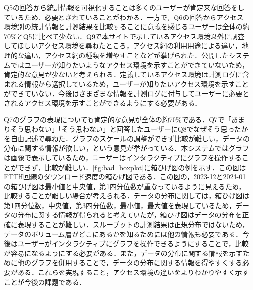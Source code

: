 Q5の回答から統計情報を可視化することは多くのユーザーが肯定来な回答をしているため，必要とされていることがわかる．一方で，Q6の回答からアクセス環境別の統計情報と計測結果を比較することに意義を感じるユーザーは全体の約70\%とQ5に比べて少ない．Q9で本サイトで示しているアクセス環境以外に調査してほしいアクセス環境を尋ねたところ，アクセス網の利用用途による違い，地理的な違い，アクセス網の種類を増やすことなどが挙げられた．公開したシステムではユーザーが知りたいようなアクセス環境を示すことができていないため，肯定的な意見が少ないと考えられる．定義しているアクセス環境は計測ログに含まれる情報から選択しているため，ユーザーが知りたいアクセス環境を示すことができていない．今後はさまざまな情報を計測ログに付与してユーザーに必要とされるアクセス環境を示すことができるようにする必要がある．

Q7のグラフの表現についても肯定的な意見が全体の約70\%である．Q7で「あまりそう思わない」「そう思わない」と回答したユーザーにQ8でなぜそう思ったかを自由記述で尋ねた．グラフのスケールの調整ができず比較が難しい，データの分布に関する情報が欲しい，という意見が挙がっている．本システムではグラフは画像で表示しているため，ユーザーはインタラクティブにグラフを操作することができず，比較が難しい．\cref{fig:bad_boxplot}に箱ひげ図の例を示す．この図はFTTH回線のダウンロード速度の箱ひげ図である．この図の，2023-12と2024-01の箱ひげ図は最小値と中央値，第1四分位数が重なっているように見えるため，比較することが難しい場合が考えられる．データの分布に関しては，箱ひげ図は第1四分位数，中央値，第3四分位数，最小値，最大値を表現しているため，データの分布に関する情報が得られると考えていたが，箱ひげ図はデータの分布を正確に表現することが難しい．スループットの計測結果は正規分布ではないため，データのボリューム層がどこにあるかを知るためには他の情報も必要である．今後はユーザーがインタラクティブにグラフを操作できるようにすることで，比較が容易になるようにする必要がある．また，データの分布に関する情報を示すために他のグラフを併用することで，データの分布に関する情報を得やすくする必要がある．これらを実現すること，アクセス環境の違いをよりわかりやすく示すことが今後の課題である．

